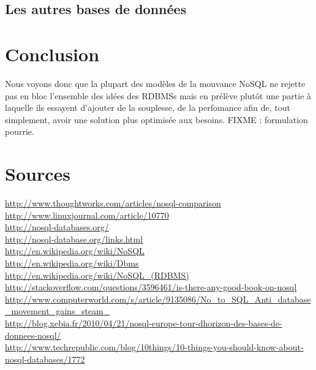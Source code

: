 \documentclass[11pt]{article}
\begin{document}
\subsection{Les autres bases de données}

\section{Conclusion}
Nous voyons donc que la plupart des modèles de la mouvance NoSQL ne rejette pas en bloc l'ensemble des idées des RDBMSs mais en prélève plutôt une partie à laquelle ils essayent d'ajouter de la souplesse, de la perfomance afin de, tout simplement, avoir une solution plus optimisée aux besoins. FIXME : formulation pourrie.
\section*{Sources}
\url{http://www.thoughtworks.com/articles/nosql-comparison} \\
\url{http://www.linuxjournal.com/article/10770} \\
\url{http://nosql-databases.org/} \\
\url{http://nosql-database.org/links.html} \\
\url{http://en.wikipedia.org/wiki/NoSQL} \\
\url{http://en.wikipedia.org/wiki/Dbms} \\
\url{http://en.wikipedia.org/wiki/NoSQL_(RDBMS)} \\
\url{http://stackoverflow.com/questions/3596461/is-there-any-good-book-on-nosql} \\
\url{http://www.computerworld.com/s/article/9135086/No_to_SQL_Anti_database_movement_gains_steam_} \\
\url{http://blog.xebia.fr/2010/04/21/nosql-europe-tour-dhorizon-des-bases-de-donnees-nosql/} \\
\url{http://www.techrepublic.com/blog/10things/10-things-you-should-know-about-nosql-databases/1772} \\
\end{document}
